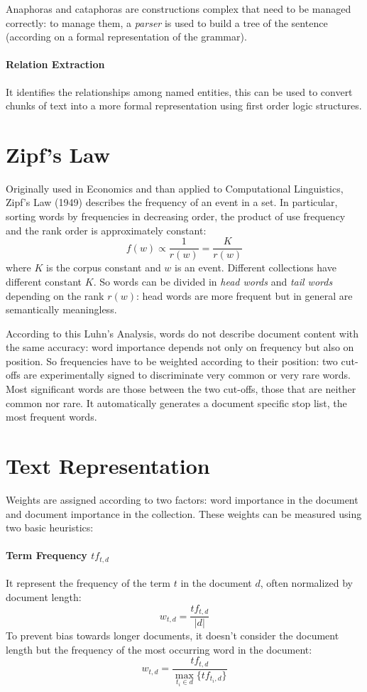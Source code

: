 \documentclass[11pt, a4page]{article}
\begin{document}
Anaphoras and cataphoras are constructions complex that need to be managed correctly: to manage them, a \textit{parser} is used to build a tree of the sentence (according on a formal representation of the grammar).

\paragraph{Relation Extraction}
It identifies the relationships among named entities, this can be used to convert chunks of text into a more formal representation using first order logic structures.


\section{Zipf's Law}
Originally used in Economics and than applied to Computational Linguistics, Zipf's Law (1949) describes the frequency of an event in a set.
In particular, sorting words by frequencies in decreasing order, the product of use frequency and the rank order is approximately constant:
\begin{equation*}
  f(w) \propto \frac{1}{r(w)} = \frac{K}{r(w)}
\end{equation*}
where $K$ is the corpus constant and $w$ is an event. 
Different collections have different constant $K$. 
So words can be divided in \textit{head words} and \textit{tail words} depending on the rank $r(w)$: head words are more frequent but in general are semantically meaningless.

According to this Luhn's Analysis, words do not describe document content with the same accuracy: word importance depends not only on frequency but also on position.
So frequencies have to be weighted according to their position: two cut-offs are experimentally signed to discriminate very common or very rare words.
Most significant words are those between the two cut-offs, those that are neither common nor rare.
It automatically generates a document specific stop list, the most frequent words.

\section{Text Representation}
Weights are assigned according to two factors: word importance in the document and document importance in the collection.
These weights can be measured using two basic heuristics:

\paragraph{Term Frequency $tf_{t, d}$} It represent the frequency of the term $t$ in the document $d$, often normalized by document length:
\begin{equation*}
  w_{t, d} = \frac{tf_{t, d}}{|d|}
\end{equation*}
To prevent bias towards longer documents, it doesn't consider the document length but the frequency of the most occurring word in the document:
\begin{equation*}
  w_{t, d} = \frac{tf_{t, d}}{\displaystyle \max_{t_i \in d} \{tf_{t_i, d}\}}
\end{equation*}
\end{document}
